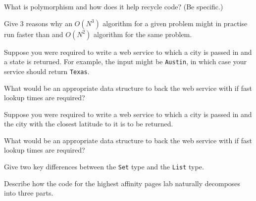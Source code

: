 \documentclass[11pt]{exam}
\begin{document}
\begin{questions}
\question[5] What is polymorphism and how does it help recycle code? (Be specific.)

\question[6] Give 3 reasons why an $O(N^3)$ algorithm for a given problem 
might in practise run faster than and $O(N^2)$ algorithm for the same problem.

\question[6] Suppose you were required to write a web service to which a city is passed
in and a state is returned. For example, the input might be {\tt Austin}, in which case
your service should return {\tt Texas}.

What would be an appropriate data structure to back the web service with if fast lookup times
are required?

\question[6] Suppose you were required to write a web service to which a city is passed
in and the city with the closest latitude to it is to be returned.

What would be an appropriate data structure to back the web service with if fast lookup times
are required?

\question[4] Give two key differences between the {\tt Set} type and the {\tt List} type.

\question[4] Describe how the code for the highest affinity pages lab naturally decomposes
into three parts.

\end{questions}
\end{document}
